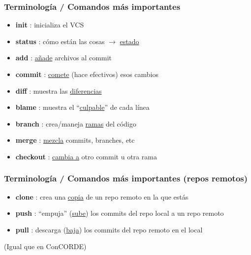 \documentclass{beamer}
\begin{document}
\begin{frame}\frametitle{Terminología / Comandos más importantes}
	\begin{itemize}
		\item \textbf{\textbf{init}		}: inicializa el VCS
		\item \textbf{\textbf{status}	}: cómo están las cosas $\rightarrow$ \underline{estado}
		\item \textbf{\textbf{add}		}: \underline{añade} archivos al commit
		\item \textbf{\textbf{commit}	}: \underline{comete} (hace efectivos) esos cambios
		\item \textbf{\textbf{diff}		}: muestra las \underline{diferencias}
		\item \textbf{\textbf{blame}	}: muestra el ``\underline{culpable}'' de cada línea
		\item \textbf{\textbf{branch}	}: crea/maneja \underline{ramas} del código
		\item \textbf{\textbf{merge}	}: \underline{mezcla} commits, branches, etc
		\item \textbf{\textbf{checkout}	}: \underline{cambia a} otro commit u otra rama
	\end{itemize}
\end{frame}

\begin{frame}\frametitle{Terminología / Comandos más importantes (repos remotos)}
	\begin{itemize}
		\item \textbf{\textbf{clone}	}: crea una \underline{copia} de un repo remoto en la que estás
		\item \textbf{\textbf{push}		}: ``empuja'' (\underline{sube}) los commits del repo local a un repo remoto
		\item \textbf{\textbf{pull}		}: descarga (\underline{baja}) los commits del repo remoto en el local
	\end{itemize}
	\vspace{2cm}
	{\tiny \hfill (Igual que en ConCORDE)}
\end{frame}


%
%
%
%
%
%
%
\end{document}
